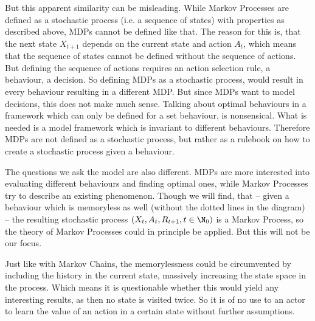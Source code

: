 But this apparent similarity can be misleading. While Markov Processes are defined as a stochastic process (i.e. a sequence of states) with properties as described above, MDPs cannot be defined like that. The reason for this is, that the next state \(X_{t+1}\) depends on the current state and action \(A_{t}\), which means that the sequence of states cannot be defined without the sequence of actions. But defining the sequence of actions requires an action selection rule, a behaviour, a decision. So defining MDPs as a stochastic process, would result in every behaviour resulting in a different MDP. But since MDPs want to model decisions, this does not make much sense. Talking about optimal behaviours in a framework which can only be defined for a set behaviour, is nonsensical. What is needed is a model framework which is invariant to different behaviours. Therefore MDPs are not defined as a stochastic process, but rather as a rulebook on how to create a stochastic process given a behaviour. 

The questions we ask the model are also different.  MDPs are more interested into evaluating different behaviours and finding optimal ones, while Markov Processes try to describe an existing phenomenon. Though we will find, that -- given a behaviour which is memoryless as well (without the dotted lines in the diagram) -- the resulting stochastic process \((X_t,A_t,R_{t+1},t\in\N_0)\) is a Markov Process, so the theory of Markov Processes could in principle be applied. But this will not be our focus. 

Just like with Markov Chains, the memorylessness could be circumvented by including the history in the current state, massively increasing the state space in the process. Which means it is questionable whether this would yield any interesting results, as then no state is visited twice. So it is of no use to an actor to learn the value of an action in a certain state without further assumptions.

